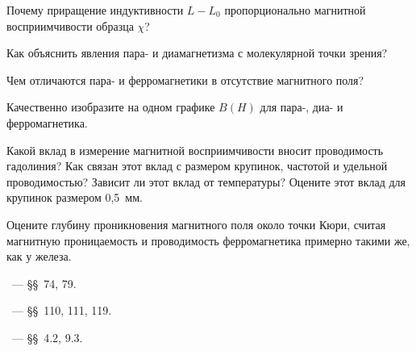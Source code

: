 \begin{lab:questions}

    \item Почему приращение индуктивности $L-L_0$ пропорционально магнитной
    восприимчивости образца $\chi$?
	\item Как объяснить явления пара- и диамагнетизма с молекулярной точки
зрения?

	\item Чем отличаются пара- и ферромагнетики в отсутствие магнитного поля?


	\item Качественно изобразите на одном графике $B(H)$ для пара-, диа- и
ферромагнетика.

	\item Какой вклад в измерение магнитной восприимчивости вносит проводимость
гадолиния? Как связан этот вклад с размером крупинок, частотой и удельной
проводимостью? Зависит ли этот вклад от температуры? Оцените этот вклад для
крупинок размером 0,5~мм.
\item Оцените  глубину проникновения магнитного поля около точки Кюри, считая
магнитную проницаемость и проводимость ферромагнетика примерно такими же,
как у железа.
\end{lab:questions}


\begin{lab:literature}
	\item \SivuhinIII~--- \S\S~74, 79.

	\item \Kalashnikov~--- \S\S~110, 111, 119.

    \item \Kirichenko~--- \S\S~4.2, 9.3.
\end{lab:literature}

